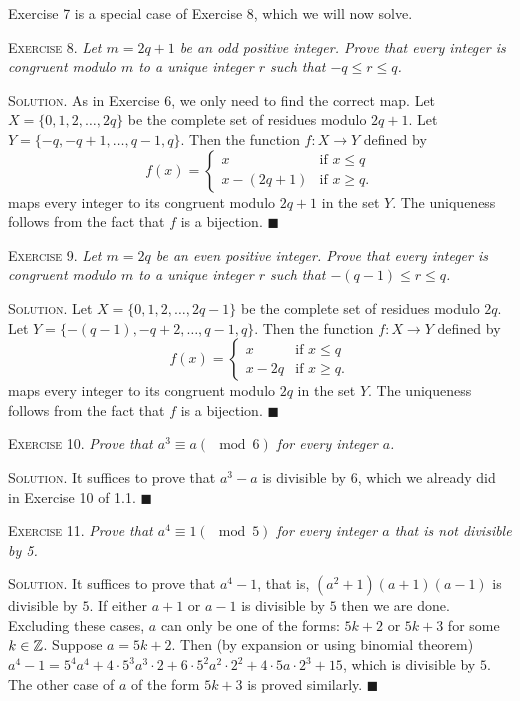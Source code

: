 \documentclass[11pt, leqno]{article}
\newcommand{\done}{\ensuremath{\blacksquare}}
\begin{document}
Exercise 7 is a special case of Exercise 8, which we will now solve.

\textsc{Exercise 8}. \emph{Let $m = 2q + 1$ be an odd positive integer. Prove that every integer is congruent modulo $m$ to a unique integer $r$ such that $-q \leq r \leq q$.}

\textsc{Solution}. As in Exercise 6, we only need to find the correct map. Let $X=\{0,1,2,\ldots, 2q\}$ be the complete set of residues modulo $2q+1$. Let $Y = \{-q,-q+1,\ldots,q-1,q\}$. Then the function $f:X\to Y$ defined by 
\begin{displaymath}
f(x) =
\begin{cases}
  x & \text{if } x\leq q \\
  x-(2q+1) & \text{if } x\geq q.
\end{cases}
\end{displaymath}
maps every integer to its congruent modulo $2q+1$ in the set $Y$. The uniqueness follows from the fact that $f$ is a bijection. \done

\textsc{Exercise 9}. \emph{Let $m=2q$ be an even positive integer. Prove that every integer is congruent modulo $m$ to a unique integer $r$ such that $-(q-1) \leq r \leq q$.}

\textsc{Solution}. Let $X=\{0,1,2,\ldots,2q-1\}$ be the complete set of residues modulo $2q$. Let $Y=\{-(q-1),-q+2,\ldots,q-1,q\}$. Then the function $f:X\to Y$ defined by 
\begin{displaymath}
f(x) =
\begin{cases}
  x & \text{if } x \leq q \\
  x-2q & \text{if } x\geq q.
\end{cases}
\end{displaymath}
maps every integer to its congruent modulo $2q$ in the set $Y$. The uniqueness follows from the fact that $f$ is a bijection. \done

\textsc{Exercise 10}. \emph{Prove that $a^3 \equiv a (\mod 6)$ for every integer $a$.}

\textsc{Solution}. It suffices to prove that $a^3-a$ is divisible by $6$, which we already did in Exercise 10 of 1.1. \done

\textsc{Exercise 11}. \emph{Prove that $a^4\equiv 1 (\mod 5)$ for every integer $a$ that is not divisible by 5.}

\textsc{Solution}. It suffices to prove that $a^4-1$, that is, $(a^2+1)(a+1)(a-1)$ is divisible by $5$. If either $a+1$ or $a-1$ is divisible by $5$ then we are done. Excluding these cases, $a$ can only be one of the forms: $5k+2$ or $5k+3$ for some $k\in\mathbb{Z}$. Suppose $a=5k+2$. Then (by expansion or using binomial theorem) $a^4-1 = 5^4a^4 + 4\cdot 5^3a^3 \cdot 2 + 6\cdot 5^2a^2\cdot 2^2 + 4\cdot 5a\cdot 2^3 + 15$, which is divisible by $5$. The other case of $a$ of the form $5k+3$ is proved similarly. \done
\end{document}
